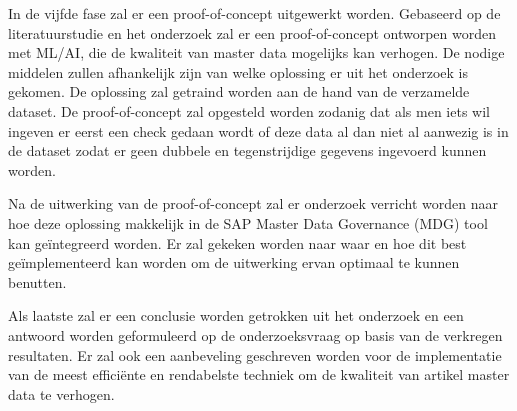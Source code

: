In de vijfde fase zal er een proof-of-concept uitgewerkt worden. Gebaseerd op de literatuurstudie en het onderzoek zal er een proof-of-concept ontworpen worden met ML/AI, die de kwaliteit van master data mogelijks kan verhogen. De nodige middelen zullen afhankelijk zijn van welke oplossing er uit het onderzoek is gekomen. De oplossing zal getraind worden aan de hand van de verzamelde dataset. De proof-of-concept zal opgesteld worden zodanig dat als men iets wil ingeven er eerst een check gedaan wordt of deze data al dan niet al aanwezig is in de dataset zodat er geen dubbele en tegenstrijdige gegevens ingevoerd kunnen worden.

Na de uitwerking van de proof-of-concept zal er onderzoek verricht worden naar hoe deze oplossing makkelijk in de SAP Master Data Governance (MDG) tool kan geïntegreerd worden. Er zal gekeken worden naar waar en hoe dit best geïmplementeerd kan worden om de uitwerking ervan optimaal te kunnen benutten.

Als laatste zal er een conclusie worden getrokken uit het onderzoek en een antwoord worden geformuleerd op de onderzoeksvraag op basis van de verkregen resultaten. Er zal ook een aanbeveling geschreven worden voor de implementatie van de meest efficiënte en rendabelste techniek om de kwaliteit van artikel master data te verhogen. 

